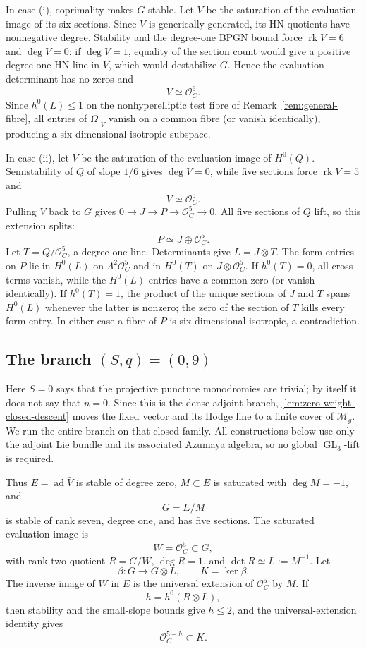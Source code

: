 \documentclass[11pt]{article}
\theoremstyle{definition}
\newcommand{\Ocal}{\mathcal O}
\newcommand{\Mcal}{\mathcal M}
\newcommand{\rk}{\operatorname{rk}}
\newcommand{\ad}{\operatorname{ad}}
\newcommand{\GL}{\operatorname{GL}}
\begin{document}
In case (i), coprimality makes $G$ stable.  Let $V$ be the saturation of the
evaluation image of its six sections.  Since $V$ is generically generated,
its HN quotients have nonnegative degree.  Stability and the degree-one BPGN
bound force $\rk V=6$ and $\deg V=0$: if $\deg V=1$, equality of the section
count would give a positive degree-one HN line in $V$, which would destabilize
$G$.  Hence the evaluation determinant has no zeros and
\[
 V\simeq\Ocal_C^6.
\]
Since $h^0(L)\le1$ on the nonhyperelliptic test fibre of
Remark~\ref{rem:general-fibre}, all entries of
$\Omega|_V$ vanish on a common fibre (or vanish identically), producing a
six-dimensional isotropic subspace.

In case (ii), let $V$ be the saturation of the evaluation image of
$H^0(Q)$.  Semistability of $Q$ of slope $1/6$ gives $\deg V=0$, while five
sections force $\rk V=5$ and
\[
 V\simeq\Ocal_C^5.
\]
Pulling $V$ back to $G$ gives $0\to J\to P\to\Ocal_C^5\to0$.  All five
sections of $Q$ lift, so this extension splits:
\[
 P\simeq J\oplus\Ocal_C^5.
\]
Let $T=Q/\Ocal_C^5$, a degree-one line.  Determinants give
$L=J\otimes T$.  The form entries on $P$ lie in $H^0(L)$ on
$\Lambda^2\Ocal_C^5$ and in $H^0(T)$ on $J\otimes\Ocal_C^5$.  If
$h^0(T)=0$, all cross terms vanish, while the $H^0(L)$ entries have a common
zero (or vanish identically).  If $h^0(T)=1$, the product of the unique
sections of $J$ and $T$ spans $H^0(L)$ whenever the latter is nonzero; the
zero of the section of $T$ kills every form entry.  In either case a fibre of
$P$ is six-dimensional isotropic, a contradiction.

\subsection{The branch \texorpdfstring{$(S,q)=(0,9)$}{(S,q)=(0,9)}}
\label{subsec:q9}

Here $S=0$ says that the projective puncture monodromies are trivial; by
itself it does not say that $n=0$.  Since this is the dense adjoint branch,
\cref{lem:zero-weight-closed-descent} moves the fixed vector and its Hodge
line to a finite cover of $\Mcal_g$.  We run the entire branch on that closed
family.  All constructions below use only the adjoint Lie bundle and its
associated Azumaya algebra, so no global $\GL_3$-lift is required.

Thus $E=\ad\bar V$ is stable of degree zero, $M\subset E$ is saturated with
$\deg M=-1$, and
\[
 G=E/M
\]
is stable of rank seven, degree one, and has five sections.  The saturated
evaluation image is
\[
 W=\Ocal_C^5\subset G,
\]
with rank-two quotient $R=G/W$, $\deg R=1$, and
$\det R\simeq L:=M^{-1}$.  Let
\[
 \beta:G\longrightarrow G\otimes L,
 \qquad K=\ker\beta.
\]
The inverse image of $W$ in $E$ is the universal extension of
$\Ocal_C^5$ by $M$.  If
\[
 h=h^0(R\otimes L),
\]
then stability and the small-slope bounds give $h\le2$, and the
universal-extension identity gives
\begin{equation}\label{eq:q9-large-kernel}
 \Ocal_C^{5-h}\subset K.
\end{equation}
\end{document}
